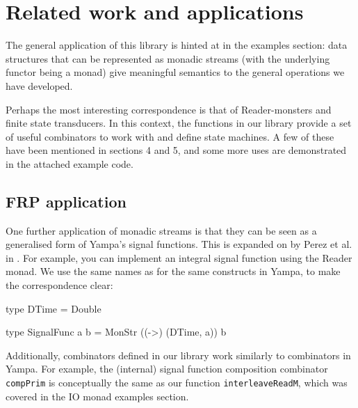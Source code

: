 
\section{Related work and applications}

The general application of this library is hinted at in the examples section: data structures that can be represented as monadic streams (with the underlying functor being a monad) give meaningful semantics to the general operations we have developed.

Perhaps the most interesting correspondence is that of Reader-monsters and finite state transducers. In this context, the functions in our library provide a set of useful combinators to work with and define state machines. A few of these have been mentioned in sections 4 and 5, and some more uses are demonstrated in the attached example code.

\subsection{FRP application}

One further application of monadic streams is that they can be seen as a generalised form of Yampa's \cite{yampa_arcade} signal functions. This is expanded on by Perez et al. in \cite{frp_refactored}. For example, you can implement an integral signal function using the Reader monad. We use the same names as for the same constructs in Yampa, to make the correspondence clear:

\begin{haskell}
type DTime = Double

type SignalFunc a b = MonStr ((->) (DTime, a)) b
\end{haskell}


Additionally, combinators defined in our library work similarly to combinators in Yampa. For example, the (internal) signal function composition combinator \verb+compPrim+ is conceptually the same as our function \verb+interleaveReadM+, which was covered in the IO monad examples section.

